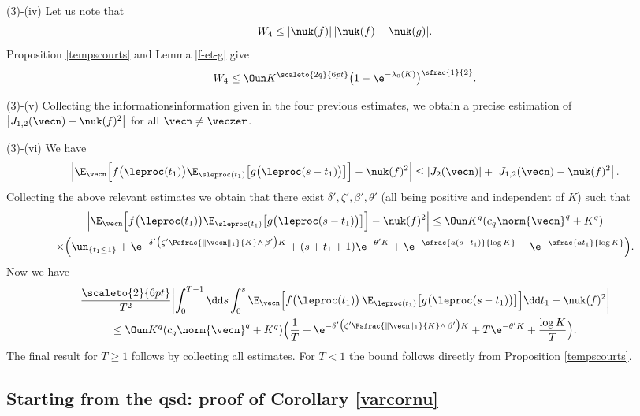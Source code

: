 (3)-(iv) Let us note that
\[
W_{4} \leq |\nuk(f)| \,|\nuk(f)-\nuk(g)|.
\]
Proposition \ref{tempscourts} and Lemma \ref{f-et-g} give
\[
W_{4} \leq \Oun K^{\scaleto{2q}{6pt}}\bigl(1-\e^{-\lambda_0(K)}\bigr)^{\sfrac{1}{2}}.
\]

(3)-(v) Collecting the informationsinformation given in the four previous estimates, we obtain a precise estimation
of $\left|J_{1,2}(\vecn) -\nuk(f)^2\right|$ for all $\vecn\neq \veczer$.

(3)-(vi)
We have
\[
\left|
\E_{\vecn}\Bigl[f\bigl(\leproc(t_{1})\bigr) \E_{\sleproc(t_{1}) } \bigl[g\bigl(\leproc(s-t_1)\bigr)\bigr]\Bigr]
-\nuk(f)^2
\right|
\leq |J_{2}(\vecn)| + \left|J_{1,2}(\vecn) -\nuk(f)^2
\right|.
\]
Collecting the above relevant estimates we obtain that there exist $\delta',\zeta', \beta', \theta'$ (all being positive and independent
of $K$) such that
\begin{multline*}
\left|
\E_{\vecn}\Bigl[f\bigl(\leproc(t_{1})\bigr) \E_{\sleproc(t_{1}) } \bigl[g\bigl(\leproc(s-t_1)\bigr)\bigr]\Bigr]-\nuk(f)^2
\right| \leq \Oun K^q (c_q\norm{\vecn}^{q} +K^q)\\
\times \Bigl(
\un_{\{t_1\leq 1\}}+ \e^{-\delta'\bigl(\zeta' \Psfrac{\|\vecn\|_{1}}{K}\wedge\, \beta'\bigr)K} + (s+t_1+1)\e^{-\theta' K}
+ \e^{-\sfrac{a(s-t_{1})}{\log K}} + \e^{-\sfrac{a t_{1}}{\log K}}
\Bigr).
\end{multline*}
Now we have
\begin{multline*}
\frac{\scaleto{2}{6pt}}{T^2} \biggl|\int_{0}^{T-1} \dd s\int_{0}^{s}\E_{\vecn}
\Bigl[f\bigl(\leproc(t_{1})\bigr)\, \E_{\leproc(t_{1}) } \bigl[g\bigl(\leproc(s-t_1)\bigr)\bigr]\Bigr]\dd t_{1}- \nuk(f)^2\biggr|\\
\leq \Oun K^q (c_q\norm{\vecn}^{q} +K^q)
\Bigl(
\frac{1}{T}+ \e^{-\delta'\bigl(\zeta' \Psfrac{\|\vecn\|_{1}}{K}\wedge\, \beta'\bigr)K} + T \e^{-\theta' K} + \frac{\log K}{T}
\Bigr).
\end{multline*}
The final result for $T\geq 1$ follows by collecting all estimates. For $T<1$ the bound follows directly from Proposition \ref{tempscourts}.

\subsection{Starting from the qsd: proof of Corollary \ref{varcornu}}

